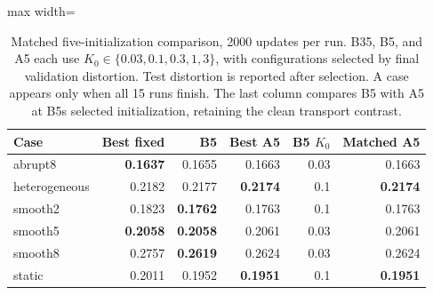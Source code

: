 \begin{table}[t]
\centering
\footnotesize\setlength{\tabcolsep}{4.2pt}\renewcommand{\arraystretch}{1.12}
\caption{Matched five-initialization comparison, 2000 updates per run. B35, B5, and A5 each use $K_0\in\{0.03,0.1,0.3,1,3\}$, with configurations selected by final validation distortion. Test distortion is reported after selection. A case appears only when all 15 runs finish. The last column compares B5 with A5 at B5\textquotesingle s selected initialization, retaining the clean transport contrast.}
\label{tab:revision-selected-mechanism}
\begin{adjustbox}{max width=\linewidth}
\begin{tabular}{lrrrrr}
\toprule
Case & Best fixed & B5 & Best A5 & B5 $K_0$ & Matched A5 \\
\midrule
abrupt8 & \textbf{0.1637} & \cellcolor{oursbg}0.1655 & 0.1663 & 0.03 & 0.1663 \\
heterogeneous & 0.2182 & \cellcolor{oursbg}0.2177 & \textbf{0.2174} & 0.1 & \textbf{0.2174} \\
smooth2 & 0.1823 & \cellcolor{oursbg}\textbf{0.1762} & 0.1763 & 0.1 & 0.1763 \\
smooth5 & \textbf{0.2058} & \cellcolor{oursbg}\textbf{0.2058} & 0.2061 & 0.03 & 0.2061 \\
smooth8 & 0.2757 & \cellcolor{oursbg}\textbf{0.2619} & 0.2624 & 0.03 & 0.2624 \\
static & 0.2011 & \cellcolor{oursbg}0.1952 & \textbf{0.1951} & 0.1 & \textbf{0.1951} \\
\bottomrule
\end{tabular}
\end{adjustbox}
\end{table}
